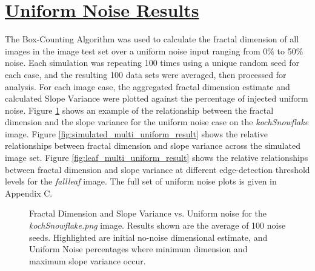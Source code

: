 \documentclass[12pt, oneside]{book}
\begin{document}
\section{\underline{Uniform Noise Results}}
The Box-Counting Algorithm was used to calculate the fractal dimension of all images in the image test set over a uniform noise input ranging from 0\% to 50\% noise.  Each simulation was repeating 100 times using a unique random seed for each case, and the resulting 100 data sets were averaged, then processed for analysis.  For each image case, the aggregated fractal dimension estimate and calculated Slope Variance were plotted against the percentage of injected uniform noise. Figure \ref{fig:kochSnowflake_uniform_result} shows an example of the relationship between the fractal dimension and the slope variance for the uniform noise case on the \textit{kochSnowflake} image.  Figure \ref{fig:simulated_multi_uniform_result} shows the relative relationships between fractal dimension and slope variance across the simulated image set.  Figure \ref{fig:leaf_multi_uniform_result} shows the relative relationships between fractal dimension and slope variance at different edge-detection threshold levels for the \textit{fallleaf} image.  The full set of uniform noise plots is given in Appendix C.

\begin{figure}[!b]
  \centering
  \caption[Fractal Dimension and Slope Variance vs. Uniform noise for the  \textit{kochSnowflake.png} image.]{Fractal Dimension and Slope Variance vs. Uniform noise for the \textit{kochSnowflake.png} image.  Results shown are the average of 100 noise seeds.  Highlighted are initial no-noise dimensional estimate, and Uniform Noise percentages where minimum dimension and maximum slope variance occur.}
  \label{fig:kochSnowflake_uniform_result}
\end{figure}
\end{document}

